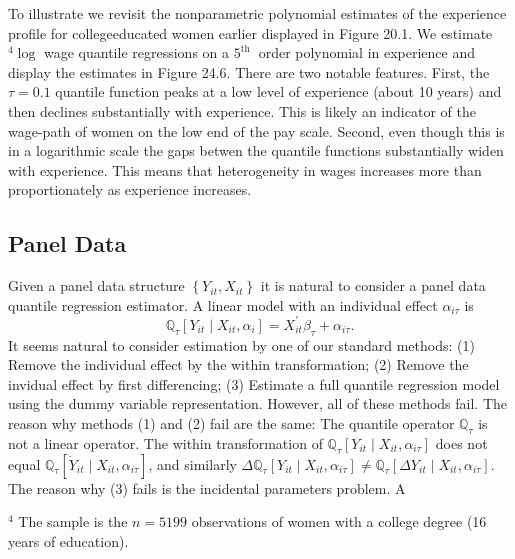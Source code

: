 \documentclass[10pt]{article}
\begin{document}
To illustrate we revisit the nonparametric polynomial estimates of the experience profile for collegeeducated women earlier displayed in Figure 20.1. We estimate ${ }^{4} \log$ wage quantile regressions on a $5^{\text {th }}$ order polynomial in experience and display the estimates in Figure 24.6. There are two notable features. First, the $\tau=0.1$ quantile function peaks at a low level of experience (about 10 years) and then declines substantially with experience. This is likely an indicator of the wage-path of women on the low end of the pay scale. Second, even though this is in a logarithmic scale the gaps betwen the quantile functions substantially widen with experience. This means that heterogeneity in wages increases more than proportionately as experience increases.

\subsection{Panel Data}
Given a panel data structure $\left\{Y_{i t}, X_{i t}\right\}$ it is natural to consider a panel data quantile regression estimator. A linear model with an individual effect $\alpha_{i \tau}$ is
$$
\mathbb{Q}_{\tau}\left[Y_{i t} \mid X_{i t}, \alpha_{i}\right]=X_{i t}^{\prime} \beta_{\tau}+\alpha_{i \tau} .
$$
It seems natural to consider estimation by one of our standard methods: (1) Remove the individual effect by the within transformation; (2) Remove the invidual effect by first differencing; (3) Estimate a full quantile regression model using the dummy variable representation. However, all of these methods fail. The reason why methods (1) and (2) fail are the same: The quantile operator $\mathbb{Q}_{\tau}$ is not a linear operator. The within transformation of $\mathbb{Q}_{\tau}\left[Y_{i t} \mid X_{i t}, \alpha_{i \tau}\right]$ does not equal $\mathbb{Q}_{\tau}\left[\dot{Y}_{i t} \mid X_{i t}, \alpha_{i \tau}\right]$, and similarly $\Delta \mathbb{Q}_{\tau}\left[Y_{i t} \mid X_{i t}, \alpha_{i \tau}\right] \neq \mathbb{Q}_{\tau}\left[\Delta Y_{i t} \mid X_{i t}, \alpha_{i \tau}\right]$. The reason why (3) fails is the incidental parameters problem. A

${ }^{4}$ The sample is the $n=5199$ observations of women with a college degree (16 years of education).
\end{document}
